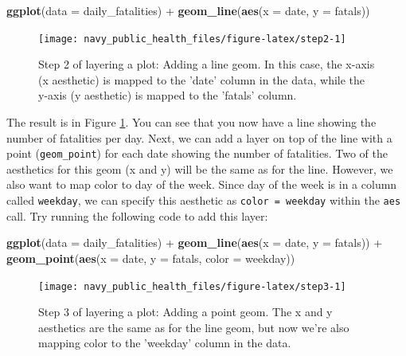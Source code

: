 \documentclass[]{tufte-book}
\newenvironment{Shaded}{}{}
\newcommand{\DataTypeTok}[1]{\textcolor[rgb]{0.56,0.13,0.00}{#1}}
\newcommand{\KeywordTok}[1]{\textcolor[rgb]{0.00,0.44,0.13}{\textbf{#1}}}
\newcommand{\NormalTok}[1]{#1}
\newcommand{\OperatorTok}[1]{\textcolor[rgb]{0.40,0.40,0.40}{#1}}
\newcommand{\StringTok}[1]{\textcolor[rgb]{0.25,0.44,0.63}{#1}}
\begin{document}
\begin{Shaded}
\begin{Highlighting}[]
\KeywordTok{ggplot}\NormalTok{(}\DataTypeTok{data =}\NormalTok{ daily_fatalities) }\OperatorTok{+}\StringTok{ }\KeywordTok{geom_line}\NormalTok{(}\KeywordTok{aes}\NormalTok{(}\DataTypeTok{x =}\NormalTok{ date, }
    \DataTypeTok{y =}\NormalTok{ fatals))}
\end{Highlighting}
\end{Shaded}

\begin{figure}
\texttt{[image: navy\_public\_health\_files/figure-latex/step2-1]} \caption[Step 2 of layering a plot]{Step 2 of layering a plot: Adding a line geom. In this case, the x-axis (x aesthetic) is mapped to the 'date' column in the data, while the y-axis (y aesthetic) is mapped to the 'fatals' column.}\label{fig:step2}
\end{figure}

The result is in Figure \ref{fig:step2}. You can see that you now have a line showing
the number of fatalities per day. Next, we can add a layer on top of the line with a
point (\texttt{geom\_point}) for each date showing the number of fatalities. Two of the
aesthetics for this geom (x and y) will be the same as for the line. However, we
also want to map color to day of the week. Since day of the week is in a column
called \texttt{weekday}, we can specify this aesthetic as \texttt{color\ =\ weekday} within the \texttt{aes}
call. Try running the following code to add this layer:

\begin{Shaded}
\begin{Highlighting}[]
\KeywordTok{ggplot}\NormalTok{(}\DataTypeTok{data =}\NormalTok{ daily_fatalities) }\OperatorTok{+}\StringTok{ }\KeywordTok{geom_line}\NormalTok{(}\KeywordTok{aes}\NormalTok{(}\DataTypeTok{x =}\NormalTok{ date, }
    \DataTypeTok{y =}\NormalTok{ fatals)) }\OperatorTok{+}\StringTok{ }\KeywordTok{geom_point}\NormalTok{(}\KeywordTok{aes}\NormalTok{(}\DataTypeTok{x =}\NormalTok{ date, }\DataTypeTok{y =}\NormalTok{ fatals, }
    \DataTypeTok{color =}\NormalTok{ weekday))}
\end{Highlighting}
\end{Shaded}

\begin{figure}
\texttt{[image: navy\_public\_health\_files/figure-latex/step3-1]} \caption[Step 3 of layering a plot]{Step 3 of layering a plot: Adding a point geom. The x and y aesthetics are the same as for the line geom, but now we're also mapping color to the 'weekday' column in the data.}\label{fig:step3}
\end{figure}
\end{document}
